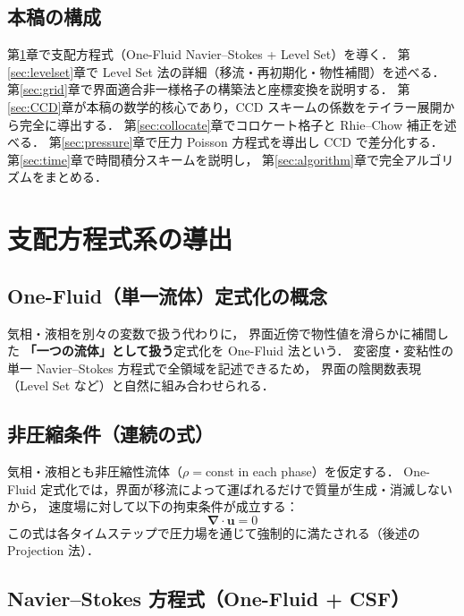 \documentclass[12pt, a4paper, titlepage]{article}
\newcommand{\jp}[1]{{\normalfont\jpfont #1}}
\newcommand{\bu}{\bm{u}}
\newcommand{\bnabla}{\bm{\nabla}}
\begin{document}
\subsection{\jp{本稿の構成}}

\jp{第\ref{sec:governing}章で支配方程式（One-Fluid Navier--Stokes + Level Set）を導く．
第\ref{sec:levelset}章で Level Set 法の詳細（移流・再初期化・物性補間）を述べる．
第\ref{sec:grid}章で界面適合非一様格子の構築法と座標変換を説明する．
第\ref{sec:CCD}章が本稿の数学的核心であり，CCD スキームの係数をテイラー展開から完全に導出する．
第\ref{sec:collocate}章でコロケート格子と Rhie--Chow 補正を述べる．
第\ref{sec:pressure}章で圧力 Poisson 方程式を導出し CCD で差分化する．
第\ref{sec:time}章で時間積分スキームを説明し，
第\ref{sec:algorithm}章で完全アルゴリズムをまとめる．}


\section{\jp{支配方程式系の導出}}
\label{sec:governing}

\subsection{\jp{One-Fluid（単一流体）定式化の概念}}

\jp{気相・液相を別々の変数で扱う代わりに，
界面近傍で物性値を滑らかに補間した \textbf{「一つの流体」として扱う}定式化を One-Fluid 法という．
変密度・変粘性の単一 Navier--Stokes 方程式で全領域を記述できるため，
界面の陰関数表現（Level Set など）と自然に組み合わせられる．}

\subsection{\jp{非圧縮条件（連続の式）}}

\jp{気相・液相とも非圧縮性流体（$\rho = $const in each phase）を仮定する．
One-Fluid 定式化では，界面が移流によって運ばれるだけで質量が生成・消滅しないから，
速度場に対して以下の拘束条件が成立する：}
\begin{equation}
  \bnabla \cdot \bu = 0
  \label{eq:continuity}
\end{equation}
\jp{この式は各タイムステップで圧力場を通じて強制的に満たされる（後述の Projection 法）．}

\subsection{Navier--Stokes \jp{方程式（One-Fluid + CSF）}}
\end{document}
